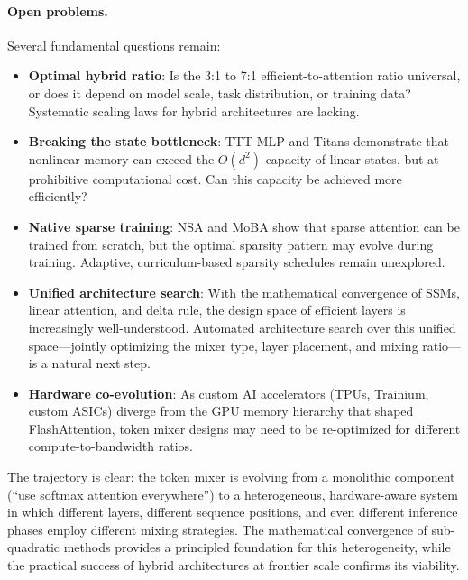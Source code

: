 \paragraph{Open problems.}
Several fundamental questions remain:
\begin{itemize}[nosep]
\item \textbf{Optimal hybrid ratio}: Is the 3:1 to 7:1 efficient-to-attention ratio universal, or does it depend on model scale, task distribution, or training data? Systematic scaling laws for hybrid architectures are lacking.
\item \textbf{Breaking the state bottleneck}: TTT-MLP and Titans demonstrate that nonlinear memory can exceed the $O(d^2)$ capacity of linear states, but at prohibitive computational cost. Can this capacity be achieved more efficiently?
\item \textbf{Native sparse training}: NSA and MoBA show that sparse attention can be trained from scratch, but the optimal sparsity pattern may evolve during training. Adaptive, curriculum-based sparsity schedules remain unexplored.
\item \textbf{Unified architecture search}: With the mathematical convergence of SSMs, linear attention, and delta rule, the design space of efficient layers is increasingly well-understood. Automated architecture search over this unified space---jointly optimizing the mixer type, layer placement, and mixing ratio---is a natural next step.
\item \textbf{Hardware co-evolution}: As custom AI accelerators (TPUs, Trainium, custom ASICs) diverge from the GPU memory hierarchy that shaped FlashAttention, token mixer designs may need to be re-optimized for different compute-to-bandwidth ratios.
\end{itemize}

The trajectory is clear: the token mixer is evolving from a monolithic component (``use softmax attention everywhere'') to a heterogeneous, hardware-aware system in which different layers, different sequence positions, and even different inference phases employ different mixing strategies. The mathematical convergence of sub-quadratic methods provides a principled foundation for this heterogeneity, while the practical success of hybrid architectures at frontier scale confirms its viability.

